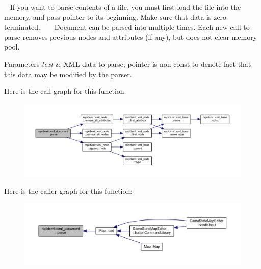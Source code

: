 ~\newline
 If you want to parse contents of a file, you must first load the file into the memory, and pass pointer to its beginning. Make sure that data is zero-\/terminated. ~\newline
~\newline
 Document can be parsed into multiple times. Each new call to parse removes previous nodes and attributes (if any), but does not clear memory pool. 
\begin{DoxyParams}{Parameters}
{\em text} & X\+M\+L data to parse; pointer is non-\/const to denote fact that this data may be modified by the parser. \\
\hline
\end{DoxyParams}


Here is the call graph for this function\+:\nopagebreak
\begin{figure}[H]
\begin{center}
\leavevmode
\includegraphics[width=350pt]{singletonrapidxml_1_1xml__document_ac6e73ff9ac323bf5a370c38feb03a6b1_cgraph}
\end{center}
\end{figure}




Here is the caller graph for this function\+:
\nopagebreak
\begin{figure}[H]
\begin{center}
\leavevmode
\includegraphics[width=350pt]{singletonrapidxml_1_1xml__document_ac6e73ff9ac323bf5a370c38feb03a6b1_icgraph}
\end{center}
\end{figure}


